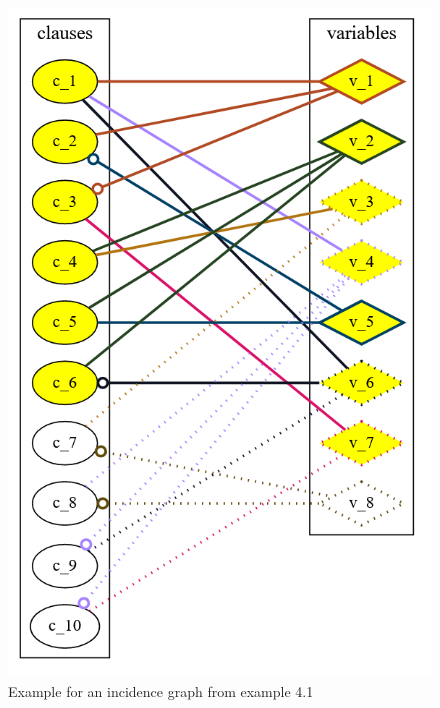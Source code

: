 \documentclass[a4paper, 12pt, bibliography=totoc]{scrartcl}
\begin{document}
\begin{figure}
	\centering
	\includegraphics[width=0.4\linewidth]{images/IncidenceStep6.png}
	\caption{Example for an incidence graph from example 4.1}
	\label{fig:incidencestep6}
\end{figure}
\end{document}
